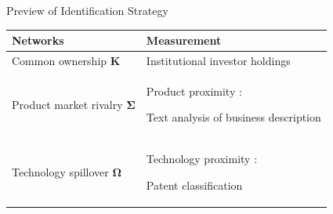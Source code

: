 \documentclass[
  10pt,               %
  aspectratio=169,    %
  handout             %
]{beamer}
\theoremstyle{plain}
\begin{document}
\begin{frame}{Preview of Identification Strategy}
  \label{identification_overview} %
  \begin{center}
        \renewcommand{\arraystretch}{1.5} %
        \begin{tabular}{lV{\linewidth}}
          Networks                              & Measurement\tabularnewline
          \hline\hline
          Common ownership $\bm{K}$         & Institutional investor holdings \citep{Backus2021-yt} \tabularnewline
          \hline
          Product market rivalry $\bm{\Sigma}$ & Product proximity \citep{Hoberg2016-jm}:

          Text analysis of business description \tabularnewline
          \hline
          Technology spillover $\bm{\Omega}$   & Technology proximity \citep{Jaffe1986-yz,Bloom2013-pn}:

          Patent classification\tabularnewline
        \end{tabular}
        \renewcommand{\arraystretch}{1.0} %
        \par\end{center}
\end{frame}




\end{document}

